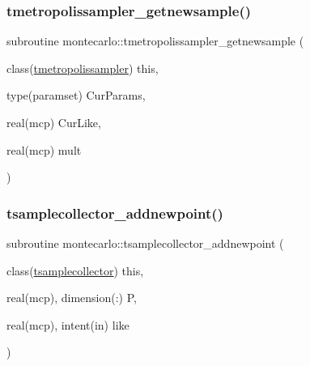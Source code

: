\subsubsection{\texorpdfstring{tmetropolissampler\+\_\+getnewsample()}{tmetropolissampler\_getnewsample()}}
{\footnotesize\ttfamily subroutine montecarlo\+::tmetropolissampler\+\_\+getnewsample (\begin{DoxyParamCaption}\item[{class(\mbox{\hyperlink{structmontecarlo_1_1tmetropolissampler}{tmetropolissampler}})}]{this,  }\item[{type(paramset)}]{Cur\+Params,  }\item[{real(mcp)}]{Cur\+Like,  }\item[{real(mcp)}]{mult }\end{DoxyParamCaption})\hspace{0.3cm}{\ttfamily [private]}}

\mbox{\label{namespacemontecarlo_a2f05ea4c2552d9891ce8860f9befe96d}} 
\subsubsection{\texorpdfstring{tsamplecollector\+\_\+addnewpoint()}{tsamplecollector\_addnewpoint()}}
{\footnotesize\ttfamily subroutine montecarlo\+::tsamplecollector\+\_\+addnewpoint (\begin{DoxyParamCaption}\item[{class(\mbox{\hyperlink{structmontecarlo_1_1tsamplecollector}{tsamplecollector}})}]{this,  }\item[{real(mcp), dimension(\+:)}]{P,  }\item[{real(mcp), intent(in)}]{like }\end{DoxyParamCaption})\hspace{0.3cm}{\ttfamily [private]}}

\mbox{\label{namespacemontecarlo_a23f6c5b28b5d65904c39f5a06efef97c}} 
